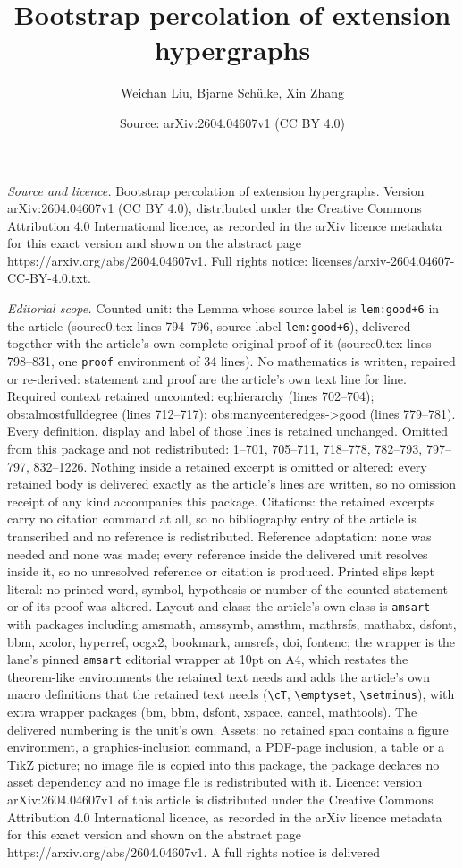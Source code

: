 \documentclass[10pt,a4paper]{amsart}
\title[Bootstrap percolation of extension hypergraphs]{Bootstrap percolation of extension hypergraphs}
\author{Weichan Liu, Bjarne Sch\"ulke, Xin Zhang}
\date{Source: arXiv:2604.04607v1 (CC BY 4.0)}
\begin{document}
\maketitle

\noindent\emph{Source and licence.} Bootstrap percolation of extension hypergraphs. Version arXiv:2604.04607v1 (CC BY 4.0), distributed under the Creative Commons Attribution 4.0 International licence, as recorded in the arXiv licence metadata for this exact version and shown on the abstract page https://arxiv.org/abs/2604.04607v1. Full rights notice: licenses/arxiv-2604.04607-CC-BY-4.0.txt.\par\smallskip

\noindent\textit{Editorial scope.} Counted unit: the Lemma whose source label is \texttt{lem:good+6} in the article (source0.tex lines 794--796, source label \texttt{lem:good+6}), delivered together with the article's own complete original proof of it (source0.tex lines 798--831, one \texttt{proof} environment of 34 lines). No mathematics is written, repaired or re-derived: statement and proof are the article's own text line for line. Required context retained uncounted: eq:hierarchy (lines 702--704); obs:almostfulldegree (lines 712--717); obs:manycenteredges->good (lines 779--781). Every definition, display and label of those lines is retained unchanged. Omitted from this package and not redistributed: 1--701, 705--711, 718--778, 782--793, 797--797, 832--1226. Nothing inside a retained excerpt is omitted or altered: every retained body is delivered exactly as the article's lines are written, so no omission receipt of any kind accompanies this package. Citations: the retained excerpts carry no citation command at all, so no bibliography entry of the article is transcribed and no reference is redistributed. Reference adaptation: none was needed and none was made; every reference inside the delivered unit resolves inside it, so no unresolved reference or citation is produced. Printed slips kept literal: no printed word, symbol, hypothesis or number of the counted statement or of its proof was altered. Layout and class: the article's own class is \texttt{amsart} with packages including amsmath, amssymb, amsthm, mathrsfs, mathabx, dsfont, bbm, xcolor, hyperref, ocgx2, bookmark, amsrefs, doi, fontenc; the wrapper is the lane's pinned \texttt{amsart} editorial wrapper at 10pt on A4, which restates the theorem-like environments the retained text needs and adds the article's own macro definitions that the retained text needs (\texttt{\textbackslash cT}, \texttt{\textbackslash emptyset}, \texttt{\textbackslash setminus}), with extra wrapper packages (bm, bbm, dsfont, xspace, cancel, mathtools). The delivered numbering is the unit's own. Assets: no retained span contains a figure environment, a graphics-inclusion command, a PDF-page inclusion, a table or a TikZ picture; no image file is copied into this package, the package declares no asset dependency and no image file is redistributed with it. Licence: version arXiv:2604.04607v1 of this article is distributed under the Creative Commons Attribution 4.0 International licence, as recorded in the arXiv licence metadata for this exact version and shown on the abstract page https://arxiv.org/abs/2604.04607v1. A full rights notice is delivered 
\end{document}
